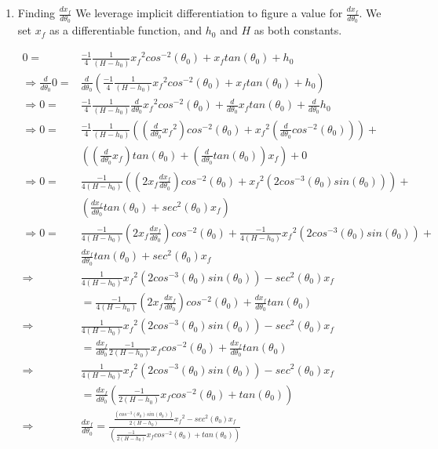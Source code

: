 \documentclass[11pt]{article}
\begin{document}
\begin{enumerate}
\item Finding \(\frac{dx_f}{d\theta_0}\)
\label{sec:orgb72aaf3}
We leverage implicit differentiation to figure a value for \(\frac{dx_f}{d\theta_0}\). We set \(x_f\) as a differentiable function, and \(h_0\) and \(H\) as both constants.

\begin{align}
    0 =& \frac{-1}{4} \frac{1}{(H-h_0)}{x_f}^2cos^{-2}(\theta_0) + x_f tan(\theta_0) + h_0 \\
\Rightarrow \frac{d}{d\theta_0} 0 =& \frac{d}{d\theta_0} (\frac{-1}{4} \frac{1}{(H-h_0)}{x_f}^2cos^{-2}(\theta_0) + x_f tan(\theta_0) + h_0) \\
\Rightarrow 0 =& \frac{-1}{4} \frac{1}{(H-h_0)}\frac{d}{d\theta_0} {x_f}^2cos^{-2}(\theta_0) + \frac{d}{d\theta_0} x_f tan(\theta_0) + \frac{d}{d\theta_0} h_0 \\
\Rightarrow 0 =& \frac{-1}{4} \frac{1}{(H-h_0)} ((\frac{d}{d\theta_0} {x_f}^2) cos^{-2}(\theta_0) + {x_f}^2 (\frac{d}{d\theta_0} cos^{-2}(\theta_0))) + \\&  ((\frac{d}{d\theta_0} x_f) tan(\theta_0) +  (\frac{d}{d\theta_0} tan(\theta_0)) x_f) + 0 \\
\Rightarrow 0 =& \frac{-1}{4(H-h_0)} ((2{x_f} \frac{dx_f}{d\theta_0}) cos^{-2}(\theta_0) + {x_f}^2 (2cos^{-3}(\theta_0) sin(\theta_0))) + \\& (\frac{dx_f}{d\theta_0} tan(\theta_0) + sec^2(\theta_0) x_f)\\
\Rightarrow 0 =& \frac{-1}{4(H-h_0)} (2{x_f} \frac{dx_f}{d\theta_0}) cos^{-2}(\theta_0) +  \frac{-1}{4(H-h_0)} {x_f}^2 (2cos^{-3}(\theta_0) sin(\theta_0)) + \\& \frac{dx_f}{d\theta_0} tan(\theta_0) + sec^2(\theta_0) x_f\\
\Rightarrow & \frac{1}{4(H-h_0)} {x_f}^2 (2cos^{-3}(\theta_0) sin(\theta_0)) - sec^2(\theta_0) x_f \\& = \frac{-1}{4(H-h_0)} (2{x_f} \frac{dx_f}{d\theta_0}) cos^{-2}(\theta_0) +  \frac{dx_f}{d\theta_0} tan(\theta_0)\\
\Rightarrow & \frac{1}{4(H-h_0)} {x_f}^2 (2cos^{-3}(\theta_0) sin(\theta_0)) - sec^2(\theta_0) x_f \\& = \frac{dx_f}{d\theta_0} \frac{-1}{2(H-h_0)} {x_f} cos^{-2}(\theta_0) +  \frac{dx_f}{d\theta_0} tan(\theta_0)\\
\Rightarrow & \frac{1}{4(H-h_0)} {x_f}^2 (2cos^{-3}(\theta_0) sin(\theta_0)) - sec^2(\theta_0) x_f \\& = \frac{dx_f}{d\theta_0} (\frac{-1}{2(H-h_0)} {x_f} cos^{-2}(\theta_0) + tan(\theta_0))\\
\Rightarrow & \frac{dx_f}{d\theta_0}  = \frac{\frac{(cos^{-3}(\theta_0) sin(\theta_0))}{2(H-h_0)} {x_f}^2  - sec^2(\theta_0) x_f }{(\frac{-1}{2(H-h_0)} {x_f} cos^{-2}(\theta_0) + tan(\theta_0))}
\end{align}


\end{enumerate}
\end{document}
